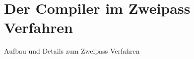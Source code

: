\chapter{Der Compiler im Zweipass Verfahren}
\label{chapter}

Aufbau und Details zum Zweipass Verfahren

